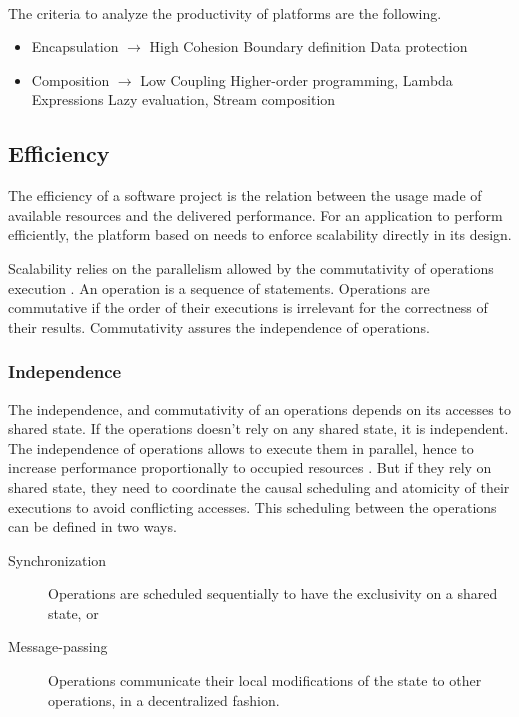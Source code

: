 



\paragraph{}

The criteria to analyze the productivity of platforms are the following.
\begin{itemize}
\item Encapsulation $\to$ High Cohesion
  \subitem Boundary definition
  \subitem Data protection
\item Composition $\to$ Low Coupling
  \subitem Higher-order programming, Lambda Expressions
  \subitem Lazy evaluation, Stream composition
\end{itemize}


\subsection{Efficiency}

The efficiency of a software project is the relation between the usage made of available resources and the delivered performance.
For an application to perform efficiently, the platform based on needs to enforce scalability directly in its design.

Scalability relies on the parallelism allowed by the commutativity of operations execution \cite{Clements2013a}.
An operation is a sequence of statements.
Operations are commutative if the order of their executions is irrelevant for the correctness of their results.
Commutativity assures the independence of operations.

\subsubsection{Independence}

The independence, and commutativity of an operations depends on its accesses to shared state.
If the operations doesn't rely on any shared state, it is independent.
The independence of operations allows to execute them in parallel, hence to increase performance proportionally to occupied resources \cite{Amdahl1967,Gunther1993}.
But if they rely on shared state, they need to coordinate the causal scheduling and atomicity of their executions to avoid conflicting accesses.
This scheduling between the operations can be defined in two ways.
\begin{description}
\item[Synchronization] Operations are scheduled sequentially to have the exclusivity on a shared state, or
\item[Message-passing] Operations communicate their local modifications of the state to other operations, in a decentralized fashion.
\end{description}

